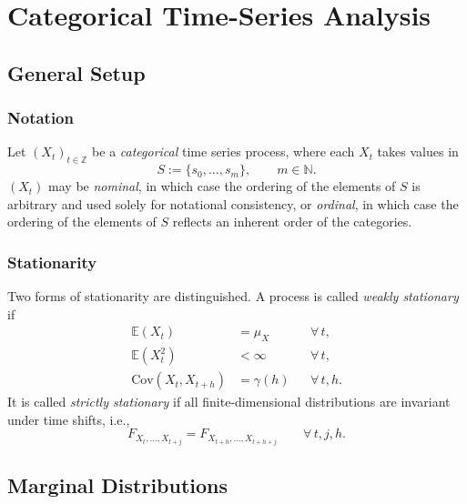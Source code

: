 \documentclass[12pt,a4paper]{scrreprt}
\begin{document}
\chapter*{Categorical Time-Series Analysis}

\section{General Setup}

\subsection{Notation}

Let $(X_t)_{t \in \mathbb{Z}}$ be a \textit{categorical} time series process, where each $X_t$
takes values in
\[
    S := \{s_0, \dots, s_m\}, \qquad m \in \mathbb{N}.
\]
$(X_t)$ may be \textit{nominal}, in which case the ordering of the elements of $S$ is arbitrary
and used solely for notational consistency, or \textit{ordinal}, in which case the ordering of
the elements of $S$ reflects an inherent order of the categories.

\subsection{Stationarity}

Two forms of stationarity are distinguished.
A process is called \emph{weakly stationary} if
\[
    \begin{aligned}
        \mathbb{E}(X_t)             &= \mu_X         &&\forall\, t,  \\
        \mathbb{E}(X_t^2)           &< \infty         &&\forall\, t,  \\
        \mathrm{Cov}(X_t, X_{t+h}) &= \gamma(h)      &&\forall\, t, h.
    \end{aligned}
\]
It is called \emph{strictly stationary} if all finite-dimensional distributions are invariant
under time shifts, i.e.,
\[
    F_{X_t, \ldots, X_{t+j}} = F_{X_{t+h}, \ldots, X_{t+h+j}}
    \qquad \forall\, t, j, h.
\]

\section{Marginal Distributions}
\end{document}
